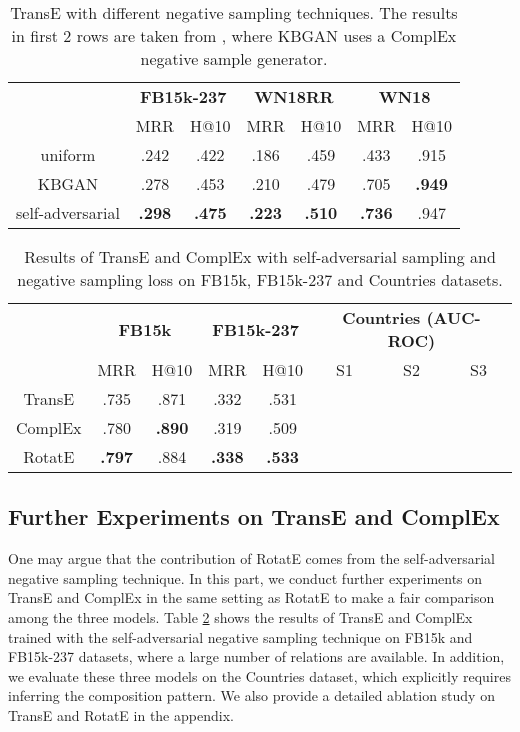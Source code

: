 \documentclass{article} \usepackage{iclr2019_conference,times}
\def\method{RotatE}
\begin{document}
\begin{table}[t]
\centering
\begin{tabular}{|c|c c|c c|c c|}
\hline
& \multicolumn{2}{c|}{\textbf{FB15k-237}} & \multicolumn{2}{c|}{\textbf{WN18RR}}  & \multicolumn{2}{c|}{\textbf{WN18}}\\
\cline{2-7}
& MRR & H@10 & MRR & H@10 & MRR & H@10 \\
\hline
uniform & .242 & .422 & .186 & .459 & .433 & .915\\
\hline
KBGAN \citep{cai2017kbgan} & .278 & .453 & .210 & .479 & .705 & \textbf{.949}\\
\hline
\hline
self-adversarial & \textbf{.298} & \textbf{.475} & \textbf{.223} & \textbf{.510} & \textbf{.736} & .947\\
\hline
\end{tabular}
\caption{TransE with different negative sampling techniques. The results in first 2 rows are taken from \citep{cai2017kbgan}, where KBGAN uses a ComplEx negative sample generator.}
\label{tab:neg}
\end{table}

\begin{table}[t]
\centering
\begin{tabular}{|c|c c|c c|c c c|}
\hline
& \multicolumn{2}{c|}{\textbf{FB15k}} & \multicolumn{2}{c|}{\textbf{FB15k-237}} & \multicolumn{3}{c|}{\textbf{Countries (AUC-ROC)}}\\
\cline{2-8}
&  MRR & H@10 & MRR & H@10 & S1 & S2 & S3\\
\hline
TransE  & .735 & .871 & .332 & .531 &   &  & \\
\hline
ComplEx  & .780 & \textbf{.890}  & .319 & .509 &   &  & \\
\hline
\method{} & \textbf{.797} & .884  & \textbf{.338} & \textbf{.533} &   &  & \\
\hline
\end{tabular}
\caption{Results of TransE and ComplEx with self-adversarial sampling and negative sampling loss on FB15k, FB15k-237 and Countries datasets.}
\label{tab:more}
\end{table}

\subsection{Further Experiments on TransE and ComplEx}
One may argue that the contribution of RotatE comes from the self-adversarial negative sampling technique. In this part, we conduct further experiments on TransE and ComplEx in the same setting as RotatE to make a fair comparison among the three models. Table \ref{tab:more} shows the results of TransE and ComplEx trained with the self-adversarial negative sampling technique on FB15k and FB15k-237 datasets, where a large number of relations are available. In addition, we evaluate these three models on the Countries dataset, which explicitly requires inferring the composition pattern. We also provide a detailed ablation study on TransE and RotatE in the appendix.
\end{document}
